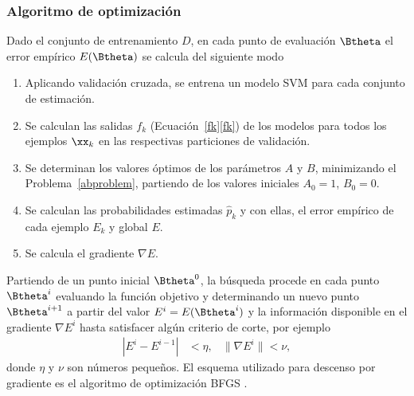%
\subsubsection{Algoritmo de optimización}
%
Dado el conjunto de entrenamiento $D$, en cada punto de evaluación
$\Btheta$ el error empírico $E(\Btheta)$ se calcula del siguiente modo
%
\begin{enumerate}
\item
  Aplicando validación cruzada, se entrena un modelo SVM para cada
  conjunto de estimación.
\item
  Se calculan las salidas $f_k$
  (\iflatexml{}Ecuación~\ref{fk}\else\autoref{fk}\fi) de los modelos
  para todos los ejemplos $\xx_k$ en las respectivas particiones de
  validación.
\item
  Se determinan los valores óptimos de los parámetros $A$ y $B$,
  minimizando el Problema~\ref{abproblem}, partiendo de los
  valores iniciales $A_0=1$, $B_0=0$.
\item
  Se calculan las probabilidades estimadas $\hat{p}_k$ y con ellas, el
  error empírico de cada ejemplo $E_k$ y global $E$.
\item
  Se calcula el gradiente $\nabla{}E$.
\end{enumerate}
%
Partiendo de un punto inicial $\Btheta^0$, la búsqueda procede en cada
punto $\Btheta^i$ evaluando la función objetivo y determinando un
nuevo punto $\Btheta^{i+1}$ a partir del valor $E^i=E(\Btheta^i)$ y la
información disponible en el gradiente $\nabla{}E^i$ hasta satisfacer
algún criterio de corte, por ejemplo
%
\begin{align*}
  |E^i-E^{i-1}|&<\eta, & \|\nabla E^i\| < \nu,
\end{align*}
%
donde $\eta$ y $\nu$ son números pequeños.
El esquema utilizado para descenso por gradiente es el algoritmo de
optimización BFGS \cite{nocedal}.
